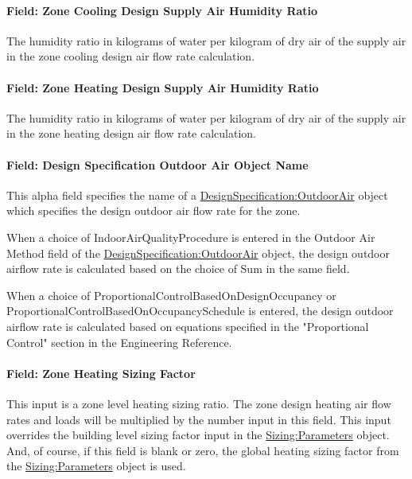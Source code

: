 \paragraph{Field: Zone Cooling Design Supply Air Humidity Ratio}\label{field-zone-cooling-design-supply-air-humidity-ratio}

The humidity ratio in kilograms of water per kilogram of dry air of the supply air in the zone cooling design air flow rate calculation.

\paragraph{Field: Zone Heating Design Supply Air Humidity Ratio}\label{field-zone-heating-design-supply-air-humidity-ratio}

The humidity ratio in kilograms of water per kilogram of dry air of the supply air in the zone heating design air flow rate calculation.

\paragraph{Field: Design Specification Outdoor Air Object Name}\label{field-design-specification-outdoor-air-object-name-000}

This alpha field specifies the name of a \hyperref[designspecificationoutdoorair]{DesignSpecification:OutdoorAir} object which specifies the design outdoor air flow rate for the zone.

When a choice of IndoorAirQualityProcedure is entered in the Outdoor Air Method field of the \hyperref[designspecificationoutdoorair]{DesignSpecification:OutdoorAir} object, the design outdoor airflow rate is calculated based on the choice of Sum in the same field.

When a choice of ProportionalControlBasedOnDesignOccupancy or ProportionalControlBasedOnOccupancySchedule is entered, the design outdoor airflow rate is calculated based on equations specified in the "Proportional Control" section in the Engineering Reference.

\paragraph{Field: Zone Heating Sizing Factor}\label{field-zone-heating-sizing-factor}

This input is a zone level heating sizing ratio. The zone design heating air flow rates and loads will be multiplied by the number input in this field. This input overrides the building level sizing factor input in the \hyperref[sizingparameters]{Sizing:Parameters} object. And, of course, if this field is blank or zero, the global heating sizing factor from the \hyperref[sizingparameters]{Sizing:Parameters} object is used.

